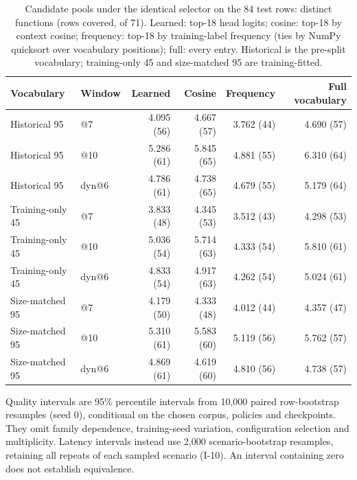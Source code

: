 \begin{table}[h]
\centering\footnotesize\renewcommand{\arraystretch}{0.9}
\setlength{\tabcolsep}{5pt}\setlength{\belowcaptionskip}{3pt}
\caption{Candidate pools under the identical selector on the 84 test rows: distinct functions (rows covered, of 71). Learned: top-18 head logits; cosine: top-18 by context cosine; frequency: top-18 by training-label frequency (ties by NumPy quicksort over vocabulary positions); full: every entry. Historical is the pre-split vocabulary; training-only 45 and size-matched 95 are training-fitted.}
\label{tab:pools}
\begin{tabular}{llrrrr}
\toprule
Vocabulary & Window & Learned & Cosine & Frequency & Full vocabulary\\
\midrule
Historical 95 & @7 & 4.095 (56) & 4.667 (57) & 3.762 (44) & 4.690 (57)\\
Historical 95 & @10 & 5.286 (61) & 5.845 (65) & 4.881 (55) & 6.310 (64)\\
Historical 95 & dyn@6 & 4.786 (61) & 4.738 (65) & 4.679 (55) & 5.179 (64)\\
Training-only 45 & @7 & 3.833 (48) & 4.345 (53) & 3.512 (43) & 4.298 (53)\\
Training-only 45 & @10 & 5.036 (54) & 5.714 (63) & 4.333 (54) & 5.810 (61)\\
Training-only 45 & dyn@6 & 4.833 (54) & 4.917 (63) & 4.262 (54) & 5.024 (61)\\
Size-matched 95 & @7 & 4.179 (50) & 4.333 (48) & 4.012 (44) & 4.357 (47)\\
Size-matched 95 & @10 & 5.310 (61) & 5.583 (60) & 5.119 (56) & 5.762 (57)\\
Size-matched 95 & dyn@6 & 4.869 (61) & 4.619 (60) & 4.810 (56) & 4.738 (57)\\
\bottomrule
\end{tabular}
\end{table}

Quality intervals are 95\% percentile intervals from 10,000 paired row-bootstrap resamples (seed 0), conditional on the chosen corpus, policies and checkpoints. They omit family dependence, training-seed variation, configuration selection and multiplicity. Latency intervals instead use 2,000 scenario-bootstrap resamples, retaining all repeats of each sampled scenario (I-10). An interval containing zero does not establish equivalence.

